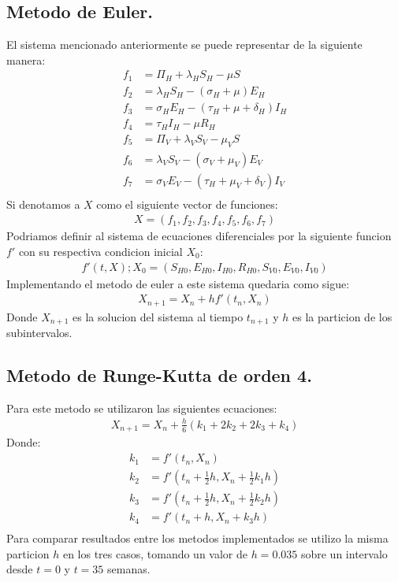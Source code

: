 	\subsection{\textbf{Metodo de Euler.}}
		El sistema mencionado anteriormente se puede representar de la siguiente manera:\\
		\begin{align*}
		f_1 &= \Pi_H + \lambda_H S_H - \mu S \\
		f_2 &= \lambda_H S_H - (\sigma_H + \mu)E_H \\
		f_3 &= \sigma_H E_H - (\tau_H + \mu + \delta_H)I_H \\
		f_4 &= \tau_H I_H - \mu R_H \\	
		f_5 &= \Pi_V + \lambda_V S_V - \mu_V S \\
		f_6 &= \lambda_V S_V - (\sigma_V + \mu_V)E_V \\
		f_7 &= \sigma_V E_V - (\tau_H + \mu_V + \delta_V)I_V \\
		\end{align*}
		Si denotamos a $X$ como el siguiente vector de funciones:\\
		\begin{align}
		X = (f_1, f_2, f_3, f_4, f_5, f_6, f_7)
		\end{align}
		Podriamos definir al sistema de ecuaciones diferenciales por la siguiente funcion $f'$ con su respectiva condicion inicial $X_0$:
		\begin{align}
		f' (t, X); X_0 = (S_{H0}, E_{H0}, I_{H0}, R_{H0}, S_{V0}, E_{V0}, I_{V0})
		\end{align}
		Implementando el metodo de euler a este sistema quedaria como sigue:
		\begin{align}
		X_{n+1} = X_n + hf'(t_n , X_n)
		\end{align}		
		Donde $X_{n+1}$ es la solucion del sistema al tiempo $t_{n+1}$ y $h$ es la particion de los subintervalos.
	\newpage
	\subsection{\textbf{Metodo de Runge-Kutta de orden 4.}}	
		Para este metodo se utilizaron las siguientes ecuaciones:
		\begin{align}
		X_{n+1} = X_n + \frac{h}{6}(k_1 + 2k_2 + 2k_3 + k_4)
		\end{align}
		Donde:
		\begin{align*}
		k_1 &= f'(t_n , X_n)\\
		k_2 &= f'(t_n + \frac{1}{2}h , X_n + \frac{1}{2}k_1h)\\
		k_3 &= f'(t_n + \frac{1}{2}h , X_n + \frac{1}{2}k_2h)\\
		k_4 &= f'(t_n + h , X_n + k_3h)\\
		\end{align*}
	Para comparar resultados entre los metodos implementados se utilizo la misma particion $h$ en los tres casos, tomando un valor de $h = 0.035$ sobre un intervalo desde $t=0$ y $t=35$ semanas.
		
